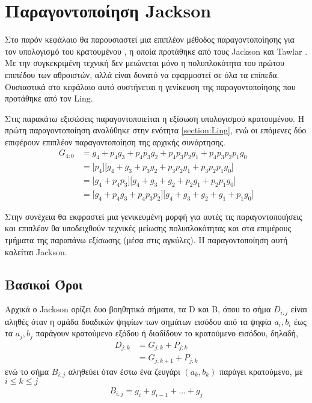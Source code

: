 \section{Παραγοντοποίηση Jackson}
\label{section:jackson}
Στο παρόν κεφάλαιο θα παρουσιαστεί μια επιπλέον μέθοδος παραγοντοποίησης 
για τον υπολογισμό του κρατουμένου , η οποία προτάθηκε από τους Jackson και 
Tawlar \cite{1399373}. Με την συγκεκριμένη τεχνική δεν μειώνεται μόνο
η πολυπλοκότητα του πρώτου επιπέδου των αθροιστών, αλλά είναι δυνατό να εφαρμοστεί σε όλα τα επίπεδα.
Ουσιαστικά στο κεφάλαιο αυτό συστήνεται η γενίκευση της 
παραγοντοποίησης που προτάθηκε από τον Ling.

Στις παρακάτω εξισώσεις παραγοντοποιείται η εξίσωση υπολογισμού κρατουμένου.
Η πρώτη παραγοντοποίηση αναλύθηκε στην ενότητα \ref{section:Ling},
ενώ οι επόμενες δύο επιφέρουν επιπλέον παραγοντοποίηση της αρχικής συνάρτησης. 
\begin{equation}
\begin{split}
    G_{4:0} &= g_4 + p_4    g_3 + p_4p_3g_2 + p_4p_3p_2g_1 + p_4p_3p_2p_1g_0 \\
            &= \Big[p_4\Big]\Big[g_4 + g_3 +p_3g_2 + p_3p_2g_1 + p_3p_2p_1g_0\Big] \\
            &=\Big[g_4 + p_4p_3\Big]\Big[g_4 + g_3 + g_2 + p_2g_1 + p_2p_1g_0\Big] \\
            &= \Big[g_4 +  p_4g_3 + p_4p_3p_2 \Big]\Big[ g_4 + g_3 + g_2 + g_1 + p_1g_0 \Big]
\end{split}
\label{jacskon_basic_eq_idea}
\end{equation}

Στην συνέχεια θα εκφραστεί μια γενικευμένη μορφή για αυτές τις παραγοντοποιήσεις και επιπλέον
θα υποδειχθούν τεχνικές μείωσης πολυπλοκότητας και στα επιμέρους τμήματα
της παραπάνω εξίσωσης (μέσα στις αγκύλες). Η παραγοντοποίηση αυτή καλείται Jackson.






\subsection{Βασικοί Όροι}


Αρχικά ο Jackson ορίζει δυο βοηθητικά σήματα, τα D και B,
όπου το σήμα $D_{i:j}$ είναι αληθές όταν η ομάδα δυαδικών ψηφίων των 
σημάτων εισόδου από τα ψηφία $a_i,b_i$ έως τα $a_j,b_j$ παράγουν κρατούμενο
εξόδου ή διαδίδουν το κρατούμενο εισόδου, δηλαδή,
\begin{equation}
\begin{split}
    D_{j:k} &= G_{j:k} + P_{j:k}\\
            &= G_{j:k+1} + P_{j:k}
\end{split}
\end{equation}
ενώ το σήμα $B_{i:j}$ αληθεύει όταν 
έστω ένα ζευγάρι $(a_k,b_k)$ παράγει κρατούμενο, με $i \leq k \leq j$
\begin{equation}
\begin{split}
    B_{i:j} = g_i + g_{i-1} + ... + g_j
\end{split}
\end{equation}

